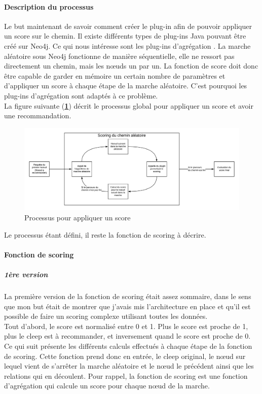 \documentclass{article} %
\begin{document}
\paragraph{Description du processus\\}
Le but maintenant de savoir comment créer le plug-in afin de pouvoir appliquer un score sur le chemin. Il existe différents types de plug-ins Java pouvant être créé sur Neo4j. Ce qui nous intéresse sont les plug-ins d'agrégation \cite{aggrg}. La marche aléatoire sous Neo4j fonctionne de manière séquentielle, elle ne ressort pas directement un chemin, mais les nœuds un par un. La fonction de score doit donc être capable de garder en mémoire un certain nombre de paramètres et d'appliquer un score à chaque étape de la marche aléatoire. C'est pourquoi les plug-ins d'agrégation sont adaptés à ce problème.\\
La figure suivante (\textbf{\ref{fig:algo}}) décrit le processus global pour appliquer un score et avoir une recommandation.
\begin{figure}[!h]
 \centering
 \includegraphics[keepaspectratio = true,scale=0.7]{proccleep.png}
 \caption{Processus pour appliquer un score}
 \label{fig:algo}
\end{figure}

Le processus étant défini, il reste la fonction de scoring à décrire. 

\paragraph{Fonction de scoring\\}
\subparagraph{1ère version\\}
La première version de la fonction de scoring était assez sommaire, dans le sens que mon but était de montrer que j'avais mis l'architecture en place et qu'il est possible de faire un scoring complexe utilisant toutes les données.\\
Tout d'abord, le score est normalisé entre 0 et 1. Plus le score est proche de 1, plus le cleep est à recommander, et inversement quand le score est proche de 0. Ce qui suit présente les différents calculs effectués à chaque étape de la fonction de scoring. Cette fonction prend donc en entrée, le cleep original, le nœud sur lequel vient de s'arrêter la marche aléatoire et le nœud le précédent ainsi que les relations qui en découlent. Pour rappel, la fonction de scoring est une fonction d'agrégation qui calcule un score pour chaque nœud de la marche.\\
\end{document}
